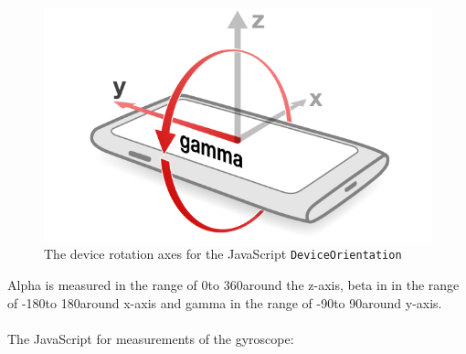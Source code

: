 \begin{figure}[H]
\begin{minipage}[c]{.23\textwidth}
  \end{minipage}
  \hspace{1cm}
  \begin{minipage}[c]{.23\textwidth}
    \centering
    \includegraphics[scale=0.2]{img/device-gamma}
    \hspace{1cm}
  \end{minipage}
  \caption{The device rotation axes for the JavaScript \texttt{DeviceOrientation}}
  \label{fig:device-rot}
\end{figure}
Alpha is measured in the range of 0\degree to 360\degree around the z-axis, beta in in the range of -180\degree to 180\degree around x-axis and gamma in the range of -90\degree to 90\degree around y-axis.\\
\\
The JavaScript for measurements of the gyroscope:

\cite[]{sensor:W3C}

